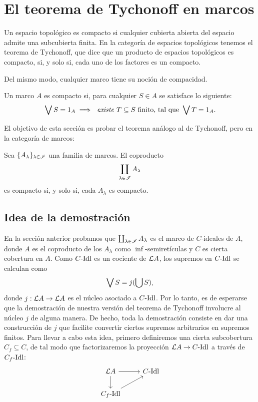 \chapter{El teorema de Tychonoff en marcos}

Un espacio topológico es compacto si cualquier cubierta
abierta del espacio admite una subcubierta finita.
En la categoría de espacios topológicos tenemos el
teorema de Tychonoff, que dice que un producto de espacios
topológicos es compacto, si, y solo si, cada uno de los
factores es un compacto.

Del mismo modo, cualquier marco tiene su noción de compacidad.
\begin{defn}
Un marco $A$ es compacto si, para cualquier $S\in A$
se satisface lo siguiente:
\[
    \Sup S= 1_A
    \implies
    \textit{ existe } T\subseteq S\text{ finito, tal que }
    \Sup T= 1_A
.\]
\end{defn}
El objetivo de esta sección es probar el teorema análogo
al de Tychonoff, pero en la categoría de marcos:
\begin{thm}
    Sea $\{A_\lambda\}_{\lambda\in\scr I}$ una familia de marcos.
    El coproducto
    \[
        \coprod_{\lambda\in\scr I}A_\lambda
    \]
    es compacto si, y solo si, cada $A_\lambda$ es compacto.
\end{thm}

\section{Idea de la demostración}

En la sección anterior probamos que
$\coprod_{\lambda\in\scr I}A_\lambda$
es el marco de $C$-ideales de $A$, donde $A$ es el coproducto
de los $A_\lambda$ como $\inf$-semiretículas y $C$ es cierta
cobertura en $A$.
Como $C\Idl$ es un cociente de $\cal LA$,
los supremos en $C\Idl$ se calculan como
\[
    \Sup S = j(\bigcup S)
,\]
donde $j:\cal LA\to\cal LA$ es el núcleo asociado a $C\Idl$.
Por lo tanto, es de esperarse que la demostración de
nuestra versión del teorema de Tychonoff involucre al núcleo
$j$ de alguna manera.
De hecho, toda la demostración consiste
en dar una construcción de $j$ que facilite convertir
ciertos supremos arbitrarios en supremos finitos.
Para llevar a cabo esta idea, primero definiremos una
cierta subcobertura $C_f\subseteq C$, de tal modo que
factorizaremos la proyección $\cal LA\to C\Idl$ a través de
$C_f\Idl$:
\[
    \begin{tikzcd}
        \cal LA \ar[d] \ar[r] & C\Idl \\
        C_f\Idl \ar[ur]
    \end{tikzcd}
\]

